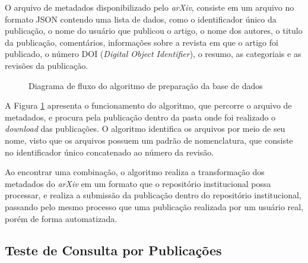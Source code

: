 O arquivo de metadados disponibilizado pelo \emph{arXiv}, consiste em um arquivo no formato
JSON contendo uma lista de dados, como o identificador único da publicação, o nome do usuário
que publicou o artigo, o nome dos autores, o titulo da publicação, comentários, informações sobre
a revista em que o artigo foi publicado, o número DOI (\emph{Digital Object Identifier}), o resumo,
as categoriais e as revisões da publicação.

\begin{figure}[H]
    \caption{Diagrama de fluxo do algoritmo de preparação da base de dados}
    \centering
    \label{fig:pseudo-algoritmo}
\end{figure}

A Figura \ref{fig:pseudo-algoritmo} apresenta o funcionamento do algoritmo, que percorre o arquivo
de metadados, e procura pela publicação dentro da pasta onde foi realizado o \emph{download} das publicações.
O algoritmo identifica os arquivos por meio de seu nome, visto que os arquivos possuem um padrão de nomenclatura,
que consiste no identificador único concatenado ao número da revisão.

Ao encontrar uma combinação, o algoritmo realiza a transformação dos metadados do
\emph{arXiv} em um formato que o repositório institucional possa processar, e realiza
a submissão da publicação dentro do repositório institucional, passando pelo mesmo
processo que uma publicação realizada por um usuário real, porém de forma automatizada.

\subsection{Teste de Consulta por Publicações}

